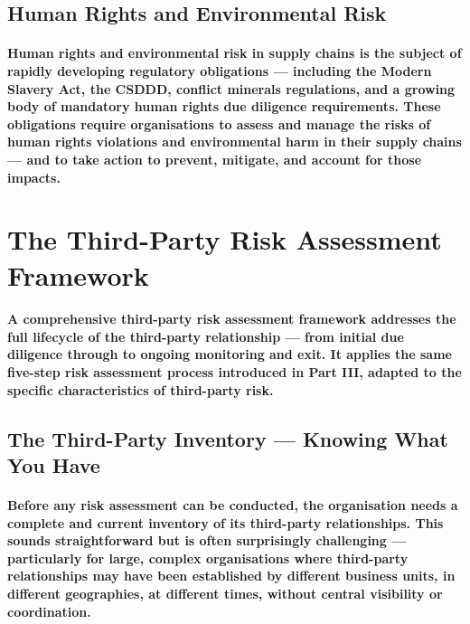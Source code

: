 \subsection{Human Rights and Environmental Risk}
\paragraph{\textbf{Human rights and environmental risk} in supply chains is the subject of rapidly developing regulatory obligations — including the Modern Slavery Act, the CSDDD, conflict minerals regulations, and a growing body of mandatory human rights due diligence requirements. These obligations require organisations to assess and manage the risks of human rights violations and environmental harm in their supply chains — and to take action to prevent, mitigate, and account for those impacts.}

\section{The Third-Party Risk Assessment Framework}
\paragraph{A comprehensive third-party risk assessment framework addresses the full lifecycle of the third-party relationship — from initial due diligence through to ongoing monitoring and exit. It applies the same five-step risk assessment process introduced in Part III, adapted to the specific characteristics of third-party risk.}

\subsection{The Third-Party Inventory — Knowing What You Have}
\paragraph{Before any risk assessment can be conducted, the organisation needs a complete and current inventory of its third-party relationships. This sounds straightforward but is often surprisingly challenging — particularly for large, complex organisations where third-party relationships may have been established by different business units, in different geographies, at different times, without central visibility or coordination.}
